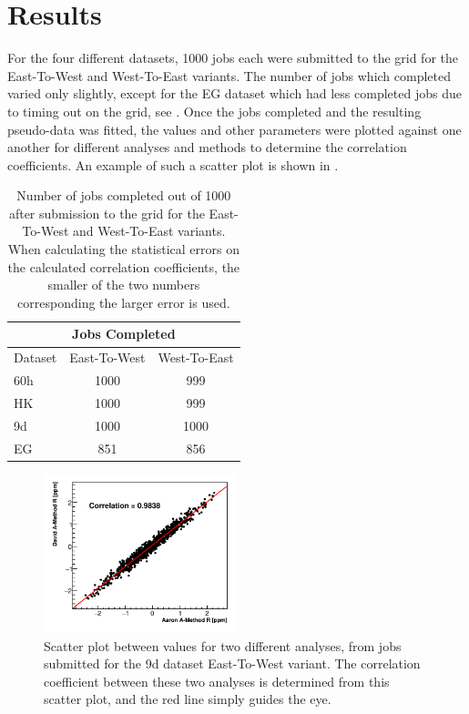 
\graphicspath{{Body/Figures/Correlations/}}

\clearpage
\section{Results}

For the four different datasets, 1000 jobs each were submitted to the grid for the East-To-West and West-To-East variants. The number of jobs which completed varied only slightly, except for the EG dataset which had less completed jobs due to timing out on the grid, see . Once the jobs completed and the resulting pseudo-data was fitted, the \R values and other parameters were plotted against one another for different analyses and methods to determine the correlation coefficients. An example of such a scatter plot is shown in .


\begin{table}[h]
\centering
\renewcommand{\arraystretch}{1.2}
\begin{tabularx}{0.4\linewidth}{@{\extracolsep{\fill}}lcc}
  \hline
    \multicolumn{3}{c}{\textbf{Jobs Completed}} \\
  \hline
  	Dataset & East-To-West & West-To-East \\
  \hline
  	60h & 1000 & 999 \\
  	HK & 1000 & 999 \\
  	9d & 1000 & 1000 \\
  	EG & 851 & 856 \\ 
  \hline
\end{tabularx}
\caption[]{Number of jobs completed out of 1000 after submission to the grid for the East-To-West and West-To-East variants. When calculating the statistical errors on the calculated correlation coefficients, the smaller of the two numbers corresponding the larger error is used.}
\label{tab:jobs}
\end{table}


\begin{figure}[h]
\centering
\includegraphics[width=0.5\textwidth]{ScatterPlot}
\caption{Scatter plot between \R values for two different analyses, from jobs submitted for the 9d dataset East-To-West variant. The correlation coefficient between these two analyses is determined from this scatter plot, and the red line simply guides the eye.}
\label{fig:scatterPlot}
\end{figure}


